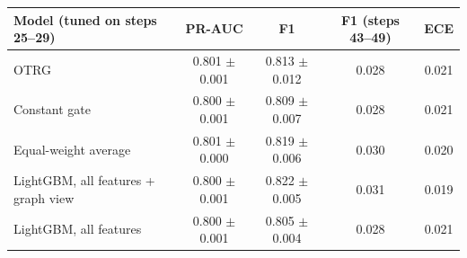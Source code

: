 \begin{tabular}{lcccc}
\toprule
Model (tuned on steps 25--29) & PR-AUC & F1 & F1 (steps 43--49) & ECE \\
\midrule
OTRG & 0.801 $\pm$ 0.001 & 0.813 $\pm$ 0.012 & 0.028 & 0.021 \\
Constant gate & 0.800 $\pm$ 0.001 & 0.809 $\pm$ 0.007 & 0.028 & 0.021 \\
Equal-weight average & 0.801 $\pm$ 0.000 & 0.819 $\pm$ 0.006 & 0.030 & 0.020 \\
LightGBM, all features + graph view & 0.800 $\pm$ 0.001 & 0.822 $\pm$ 0.005 & 0.031 & 0.019 \\
LightGBM, all features & 0.800 $\pm$ 0.001 & 0.805 $\pm$ 0.004 & 0.028 & 0.021 \\
\bottomrule
\end{tabular}
